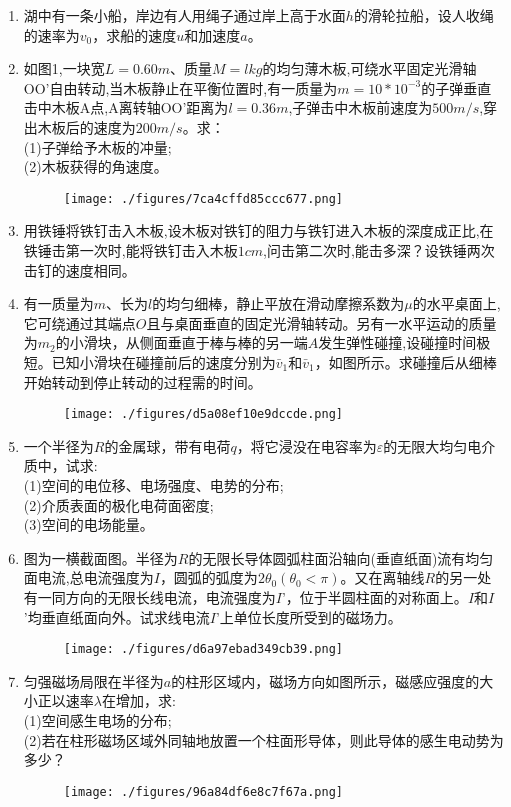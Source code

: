 
\begin{enumerate}
\item 湖中有一条小船，岸边有人用绳子通过岸上高于水面$h$的滑轮拉船，设人收绳的速率为$v_0$，求船的速度$u$和加速度$a$。
\item 如图1,一块宽$L=0.60m$、质量$M=lkg$的均匀薄木板,可绕水平固定光滑轴OO'自由转动,当木板静止在平衡位置时,有一质量为$m=10*10^{-3}$的子弹垂直击中木板A点,A离转轴OO'距离为$l=0.36m$,子弹击中木板前速度为$500m/s$,穿出木板后的速度为$200m/s$。求：\\
(1)子弹给予木板的冲量;\\
(2)木板获得的角速度。
\begin{figure}[ht]
\centering
\texttt{[image: ./figures/7ca4cffd85ccc677.png]}
\caption{} \label{fig_SSD14_1}
\end{figure}
\item 用铁锤将铁钉击入木板,设木板对铁钉的阻力与铁钉进入木板的深度成正比,在铁锤击第一次时,能将铁钉击入木板$1cm$,问击第二次时,能击多深？设铁锤两次击钉的速度相同。
\item 有一质量为$m$、长为$l$的均匀细棒，静止平放在滑动摩擦系数为$\mu$的水平桌面上,它可绕通过其端点$O$且与桌面垂直的固定光滑轴转动。另有一水平运动的质量为$m_2$的小滑块，从侧面垂直于棒与棒的另一端$A$发生弹性碰撞,设碰撞时间极短。已知小滑块在碰撞前后的速度分别为$\bar v_1$和$\bar v_1$，如图所示。求碰撞后从细棒开始转动到停止转动的过程需的时间。
\begin{figure}[ht]
\centering
\texttt{[image: ./figures/d5a08ef10e9dccde.png]}
\caption{} \label{fig_SSD14_2}
\end{figure}
\item 一个半径为$R$的金属球，带有电荷$q$，将它浸没在电容率为$\varepsilon$的无限大均匀电介质中，试求:\\
(1)空间的电位移、电场强度、电势的分布;\\
(2)介质表面的极化电荷面密度;\\
(3)空间的电场能量。
\item 图为一横截面图。半径为$R$的无限长导体圆弧柱面沿轴向(垂直纸面)流有均匀面电流,总电流强度为$I$，圆弧的弧度为$2\theta_0(\theta_0<\pi)$。又在离轴线$R$的另一处有一同方向的无限长线电流，电流强度为$I$’，位于半圆柱面的对称面上。$I$和$I$’均垂直纸面向外。试求线电流$I$’上单位长度所受到的磁场力。
\begin{figure}[ht]
\centering
\texttt{[image: ./figures/d6a97ebad349cb39.png]}
\caption{} \label{fig_SSD14_4}
\end{figure}
\item 匀强磁场局限在半径为$a$的柱形区域内，磁场方向如图所示，磁感应强度的大小正以速率$\lambda$在增加，求:\\
(1)空间感生电场的分布;\\
(2)若在柱形磁场区域外同轴地放置一个柱面形导体，则此导体的感生电动势为多少？
\begin{figure}[ht]
\centering
\texttt{[image: ./figures/96a84df6e8c7f67a.png]}
\caption{} \label{fig_SSD14_5}
\end{figure}
\end{enumerate}